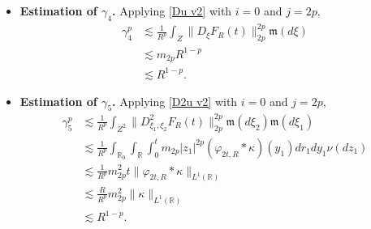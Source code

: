 \documentclass[12pt]{article}
\def\bR{\mathbb{R}}
\newcommand{\les}{\lesssim}
\def\k{\kappa}
\newcommand{\fm}{\mathfrak{m}}
\begin{document}
\begin{itemize}
We take
\begin{equation}
\label{def-q}
q=\left\{
\begin{array}{ll} 
2p-1 & \mbox{if $p \in (1,\frac{3}{2}]$} \\
2 & \mbox{if $p \in (\frac{3}{2},2]$}
\end{array} \right. .
\end{equation}
Then
\[
m_{q+1}=\left\{
\begin{array}{ll} 
m_{2p} & \mbox{if $p \in (1,\frac{3}{2}]$} \\
m_3 & \mbox{if $p \in (\frac{3}{2},2]$}
\end{array} \right. <\infty \quad \mbox{and} \quad 
R^{\frac{1-q}{2}}=\left\{
\begin{array}{ll} 
R^{1-p} & \mbox{if $p \in (1,\frac{3}{2}]$} \\
R^{-\frac{1}{2}} & \mbox{if $p \in (\frac{3}{2},2]$}
\end{array} \right. \leq  R^{\frac{1-p}{p}}.
\]

Hence, 
\[
\gamma_3 \les R^{-(1-\frac{1}{p})}.
\]

\item {\bf Estimation of $\gamma_4$.} Applying \eqref{Du v2} with $i=0$ and $j=2p$,
\begin{align*}
\gamma_4^{p} & \les \frac{1}{R^p} \int_Z \|D_{\xi}F_R(t) \|^{2p}_{2p} \fm(d\xi)\\
& \les m_{2p}R^{1-p} \\
& \les R^{1-p}.
\end{align*}

\item {\bf Estimation of $\gamma_5$.} Applying \eqref{D2u v2} with $i = 0$ and $j = 2p$, 
\begin{align*}
\gamma_5^p & \les \frac{1}{R^p} \int_{Z^2}
\|D^2_{\xi_1,\xi_2} F_R(t) \|^{2p}_{2p}\fm(d\xi_2)\fm(d\xi_1)\\
& \les \frac{1}{R^p}  \int_{\bR_0} \int_{\bR} \int_{0}^t m_{2p}|z_1|^{2p} (\varphi_{2t,R} * \k)(y_1) dr_1 dy_1 \nu(dz_1)\\
& \les \frac{1}{R^p} m_{2p}^2 t  \| \varphi_{2t,R} * \k \|_{L^{1}(\bR)} \\
& \les \frac{R}{R^p} m_{2p}^2  \|\k\|_{L^1(\bR)} \\
& \les R^{1-p}.
\end{align*}


\end{itemize}
\end{document}
